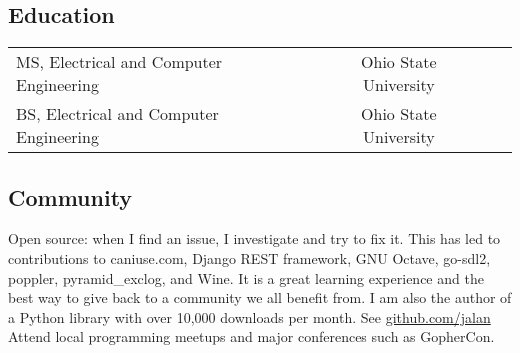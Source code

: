 \documentclass[12pt]{report}
\makeatletter
\renewcommand{\bullet}{$\vcenter{\hbox{~\huge$\cdot$~}}$}
\newenvironment{bullets}
{\tabularx{\textwidth}{ @{\bullet} X @{} }}
{\endtabularx}
\makeatother
\begin{document}
\subsection*{Education}
\begin{tabularx}{\textwidth}{ @{\bullet} l X c X r @{} }
MS, Electrical and Computer Engineering && Ohio State University \\
BS, Electrical and Computer Engineering && Ohio State University \\
\end{tabularx}

\subsection*{Community}
\begin{bullets}
Open source: when I find an issue, I investigate and try to fix it.
This has led to contributions to
	caniuse.com,
	Django REST framework,
	GNU Octave,
	go-sdl2,
	poppler,
	pyramid\_exclog,
	and
	Wine.
It is a great learning experience and the best way to give back to a community we all benefit from.
I am also the author of a Python library with over 10,000 downloads per month. See \href{https://github.com/jalan}{github.com/jalan} \\
Attend local programming meetups and major conferences such as GopherCon. \\
\end{bullets}
\end{document}

